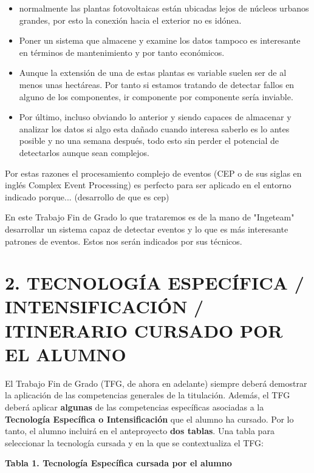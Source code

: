 \documentclass[a4paper]{article}
\begin{document}
\begin{itemize}
\item normalmente las plantas fotovoltaicas están ubicadas lejos de núcleos urbanos grandes, por esto la conexión hacia el exterior no es idónea.
\item Poner un sistema que almacene y examine los datos tampoco es interesante en términos de mantenimiento y por tanto económicos.
\item Aunque la extensión de una de estas plantas es variable suelen ser de al menos unas hectáreas. Por tanto si estamos tratando de detectar fallos en alguno de los componentes, ir componente por componente sería inviable.
\item Por último, incluso obviando lo anterior y siendo capaces de almacenar y analizar los datos si algo esta dañado cuando interesa saberlo es lo antes posible y no una semana después, todo esto sin perder el potencial de detectarlos aunque sean complejos.
\end{itemize}

Por estas razones el procesamiento complejo de eventos (CEP o de sus siglas en inglés Complex Event Processing) es perfecto para ser aplicado en el entorno indicado porque... (desarrollo de que es cep)

En este Trabajo Fin de Grado lo que trataremos es de la mano de "Ingeteam" desarrollar un sistema capaz de detectar eventos y lo que es más interesante patrones de eventos. Estos nos serán indicados por sus técnicos.

\section{2. TECNOLOG\'IA ESPEC\'IFICA / INTENSIFICACIÓN / ITINERARIO CURSADO POR EL ALUMNO}
El Trabajo Fin de Grado (TFG, de ahora en adelante) siempre deber\'a demostrar la aplicaci\'on de las competencias
generales de la titulaci\'on. Adem\'as, el TFG deber\'a aplicar \textbf{algunas} de las competencias espec\'ificas
asociadas a la \textbf{Tecnolog\'ia Espec\'ifica o Intensificaci\'on} que el alumno ha cursado. Por lo tanto, el alumno
incluir\'a en el anteproyecto \textbf{dos tablas}. Una tabla para seleccionar la tecnolog\'ia cursada y en la que se
contextualiza el TFG:


\bigskip

{\centering\bfseries
Tabla 1. Tecnolog\'ia Espec\'ifica cursada por el alumno
\par}
\end{document}
